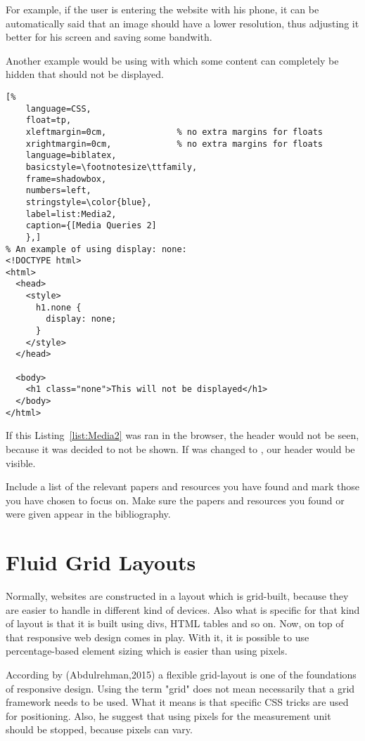 For example, if the user is entering the website with his phone, it can
be automatically said that an image should have a lower resolution, thus
adjusting it better for his screen and saving some bandwith.

Another example would be using  with which some
content can completely be hidden that should not be displayed.

\begin{lstlisting}[%
    language=CSS, 
    float=tp,
    xleftmargin=0cm,              % no extra margins for floats
    xrightmargin=0cm,             % no extra margins for floats
    language=biblatex,
    basicstyle=\footnotesize\ttfamily,
    frame=shadowbox,
    numbers=left,
    stringstyle=\color{blue},
    label=list:Media2,
    caption={[Media Queries 2]
    },]
% An example of using display: none:
<!DOCTYPE html>
<html>
  <head>
    <style>
      h1.none {
        display: none;
      }
    </style>
  </head>

  <body>
    <h1 class="none">This will not be displayed</h1>
  </body>
</html>
\end{lstlisting}



If this Listing~\ref{list:Media2} was ran in the browser, the
header would not be seen, because it was decided to not be shown. If
 was changed to , our
header would be visible.

Include a list of  the relevant papers and resources you
have found and mark those you have chosen to focus on. Make sure
 the papers and resources you found or were given appear in
the bibliography.




\section{Fluid Grid Layouts}

Normally, websites are constructed in a layout which is grid-built,
because they are easier to handle in different kind of devices. Also
what is specific for that kind of layout is that it is built using divs,
HTML tables and so on. Now, on top of that responsive web design comes
in play\parencite{B.Frain}. With it, it is possible to use
percentage-based element sizing which is easier than using pixels.

According by (Abdulrehman,2015) a flexible grid-layout is one of the
foundations of responsive design. Using the term "grid" does not mean
necessarily that a grid framework needs to be used. What it means is
that specific CSS tricks are used for positioning. Also, he suggest that
using pixels for the measurement unit should be stopped, because pixels
can vary.


